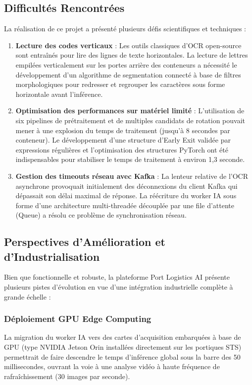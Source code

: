 \documentclass[12pt,a4paper]{article}
\begin{document}
\subsection{Difficultés Rencontrées}

La réalisation de ce projet a présenté plusieurs défis scientifiques et techniques :
\begin{enumerate}
  \item \textbf{Lecture des codes verticaux} : Les outils classiques d'OCR open-source sont entraînés pour lire des lignes de texte horizontales. La lecture de lettres empilées verticalement sur les portes arrière des conteneurs a nécessité le développement d'un algorithme de segmentation connecté à base de filtres morphologiques pour redresser et regrouper les caractères sous forme horizontale avant l'inférence.
  \item \textbf{Optimisation des performances sur matériel limité} : L'utilisation de six pipelines de prétraitement et de multiples candidats de rotation pouvait mener à une explosion du temps de traitement (jusqu'à 8 secondes par conteneur). Le développement d'une structure d'Early Exit validée par expressions régulières et l'optimisation des structures PyTorch ont été indispensables pour stabiliser le temps de traitement à environ 1,3 seconde.
  \item \textbf{Gestion des timeouts réseau avec Kafka} : La lenteur relative de l'OCR asynchrone provoquait initialement des déconnexions du client Kafka qui dépassait son délai maximal de réponse. La réécriture du worker IA sous forme d'une architecture multi-threadée découplée par une file d'attente (Queue) a résolu ce problème de synchronisation réseau.
\end{enumerate}

\subsection{Perspectives d'Amélioration et d'Industrialisation}

Bien que fonctionnelle et robuste, la plateforme Port Logistics AI présente plusieurs pistes d'évolution en vue d'une intégration industrielle complète à grande échelle :

\subsubsection{Déploiement GPU Edge Computing}
La migration du worker IA vers des cartes d'acquisition embarquées à base de GPU (type NVIDIA Jetson Orin installées directement sur les portiques STS) permettrait de faire descendre le temps d'inférence global sous la barre des 50 millisecondes, ouvrant la voie à une analyse vidéo à haute fréquence de rafraîchissement (30 images par seconde).
\end{document}

